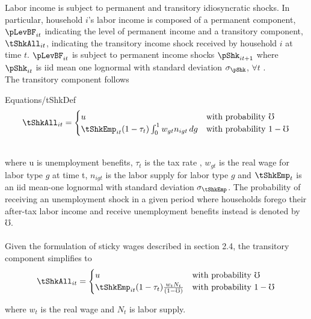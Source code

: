 \documentclass[titlepage]{\econtex}\providecommand{\texname}{BufferStockTheory}
\providecommand{\EqDir}{Equations}
\begin{document}
Labor income is subject to permanent and transitory idiosyncratic shocks. In particular, household $i$'s labor income is composed of a permanent component, $\pLevBF_{it} $ indicating the level of permanent income and a transitory component, $\tShkAll_{it} $, indicating the transitory income shock received by household $i$ at time $t$. $\pLevBF_{it} $ is subject to permanent income shocks $\pShk_{it+1}$ where $\pShk_{it}$ is iid mean one lognormal with standard deviation $\sigma_\pShk$, $\forall t$ . \\



The transitory component follows   \\
\begin{verbatimwrite}{\EqDir/tShkDef}
$$
\tShkAll _{it}=
\begin{cases}
 u \phantom{_{t+1}/\pNotZero} & \text{with probability $\mho $} \\
 \tShkEmp_{it} (1-\tau_{t})\int_{0}^{1} w_{gt}n_{igt} \, dg      & \text{with probability $1 - \mho  $} 
\end{cases} \label{eq:tShkDef}
$$
\end{verbatimwrite}
\\
where u is unemployment benefits, $\tau_{t}$ is the tax rate , $w_{gt}$ is the real wage for labor type $g$ at time t, $ n_{igt}$ is the labor supply for labor type $g$ and $\tShkEmp_{t}$ is an iid mean-one lognormal with standard deviation $\sigma_{\tShkEmp}$.  The probability of receiving an unemployment shock in a given period where households forego their after-tax labor income and receive unemployment benefits instead is denoted by $\mho$.  \\ \\

Given the formulation of sticky wages described in section 2.4, the transitory component simplifies to \\

\begin{equation}
\tShkAll _{it}=
\begin{cases}
 u \phantom{_{t+1}/\pNotZero} & \text{with probability $\mho $} \\
 \tShkEmp_{it} (1-\tau_{t})\frac{w_{t}N_{t}}{(1-\mho)}      & \text{with probability $1 - \mho  $} 
\end{cases} \label{eq:tShkDef}
\end{equation} 

where $w_{t}$ is the real wage and $N_{t}$  is labor supply.
\end{document}
